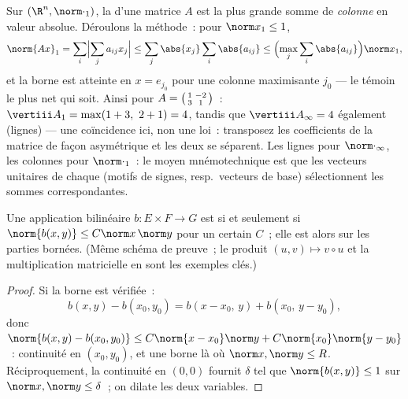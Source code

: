 \begin{example}\label{ex:b2:nvs:columnsums}
Sur $(\R^n, \norm\cdot_1)$, la  d'une matrice $A$ est
la plus grande somme de \emph{colonne} en valeur absolue. Déroulons la
méthode~: pour $\norm x_1 \leq 1$,
\[
\norm{Ax}_1 = \sum_i\Bigl|\sum_j a_{ij}x_j\Bigr|
\leq \sum_j \abs{x_j}\sum_i\abs{a_{ij}}
\leq \Bigl(\max_j\sum_i\abs{a_{ij}}\Bigr)\norm x_1 ,
\]
et la borne est atteinte en $x = e_{j_0}$ pour une colonne maximisante
$j_0$ --- le témoin le plus net qui soit. Ainsi pour $A =
\begin{psmallmatrix}1 & -2\\ 3 & 1\end{psmallmatrix}$~:
$\vertiii A_1 = \max(1 + 3,\ 2 + 1) = 4$, tandis que
$\vertiii A_\infty = 4$ également (lignes) --- une coïncidence ici, non
une loi~: transposez les coefficients de la matrice de façon
asymétrique et les deux  se séparent. Les lignes pour
$\norm\cdot_\infty$, les colonnes pour $\norm\cdot_1$~: le moyen
mnémotechnique est que les vecteurs unitaires de chaque  (motifs
de signes, resp.\ vecteurs de base) sélectionnent les sommes
correspondantes.
\end{example}

\begin{proposition}\label{prop:b2:nvs:bilinear}
Une application bilinéaire $b \colon E \times F \to G$ est  si
et seulement si $\norm{b(x,y)} \leq C\norm x\,\norm y$ pour un certain
$C$~; elle est alors  sur les parties bornées. (Même
schéma de preuve~; le produit $(u, v) \mapsto v \circ u$ et la
multiplication matricielle en sont les exemples clés.)
\end{proposition}

\begin{proof}
Si la borne est vérifiée~:
\[
b(x,y) - b(x_0,y_0) = b(x - x_0,\, y) + b(x_0,\, y - y_0),
\]
donc $\norm{b(x,y) - b(x_0,y_0)} \leq C\norm{x - x_0}\norm y +
C\norm{x_0}\norm{y - y_0}$~: continuité en $(x_0, y_0)$, et une
borne  là où $\norm x, \norm y \leq R$. Réciproquement,
la continuité en $(0,0)$ fournit $\delta$ tel que $\norm{b(x,y)} \leq 1$
sur $\norm x, \norm y \leq \delta$~; on dilate les deux variables.
\end{proof}

